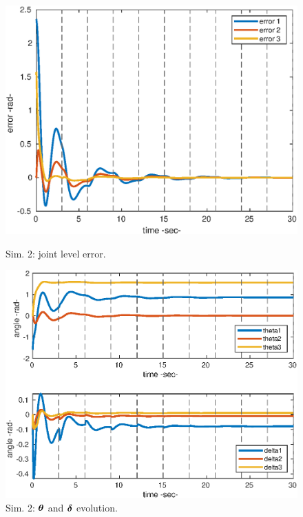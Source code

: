 ~\\
~\\
\begin{center}
\begin{figure}[h!]
\begin{minipage}[h!]{0.45\linewidth}
\begin{center}
    \includegraphics[scale=0.52]{figures/2_1_error.eps}
    \caption{\label{2_1err} 
    Sim. 2: joint level error.}
    \vspace{1cm}
    \includegraphics[scale=0.52]{figures/2_1_thetadelta.eps}
    \caption{\label{2_1qt} 
    Sim. 2: $\boldsymbol{\theta}$ and $\boldsymbol{\delta}$ evolution.}
    \vspace{1cm}

\end{center}
\end{minipage}
\end{figure}
\end{center}
